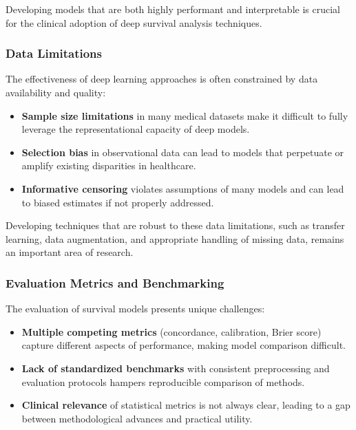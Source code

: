 Developing models that are both highly performant and interpretable is crucial for the clinical adoption of deep survival analysis techniques.

\subsubsection{Data Limitations}

The effectiveness of deep learning approaches is often constrained by data availability and quality:

\begin{itemize}
    \item \textbf{Sample size limitations} in many medical datasets make it difficult to fully leverage the representational capacity of deep models.

    \item \textbf{Selection bias} in observational data can lead to models that perpetuate or amplify existing disparities in healthcare.

    \item \textbf{Informative censoring} violates assumptions of many models and can lead to biased estimates if not properly addressed.
\end{itemize}

Developing techniques that are robust to these data limitations, such as transfer learning, data augmentation, and appropriate handling of missing data, remains an important area of research.

\subsubsection{Evaluation Metrics and Benchmarking}

The evaluation of survival models presents unique challenges:

\begin{itemize}
    \item \textbf{Multiple competing metrics} (concordance, calibration, Brier score) capture different aspects of performance, making model comparison difficult.

    \item \textbf{Lack of standardized benchmarks} with consistent preprocessing and evaluation protocols hampers reproducible comparison of methods.

    \item \textbf{Clinical relevance} of statistical metrics is not always clear, leading to a gap between methodological advances and practical utility.
\end{itemize}

